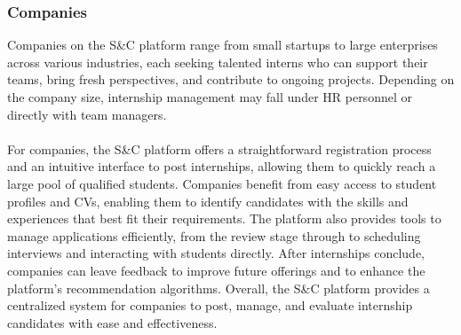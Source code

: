 \subsubsection{Companies}
Companies on the S\&C platform range from small startups to large enterprises across various industries, each seeking talented interns who can support their teams, bring fresh perspectives, and contribute to ongoing projects. Depending on the company size, internship management may fall under HR personnel or directly with team managers. \\ \\
For companies, the S\&C platform offers a straightforward registration process and an intuitive interface to post internships, allowing them to quickly reach a large pool of qualified students. Companies benefit from easy access to student profiles and CVs, enabling them to identify candidates with the skills and experiences that best fit their requirements. The platform also provides tools to manage applications efficiently, from the review stage through to scheduling interviews and interacting with students directly. After internships conclude, companies can leave feedback to improve future offerings and to enhance the platform’s recommendation algorithms. Overall, the S\&C platform provides a centralized system for companies to post, manage, and evaluate internship candidates with ease and effectiveness.

